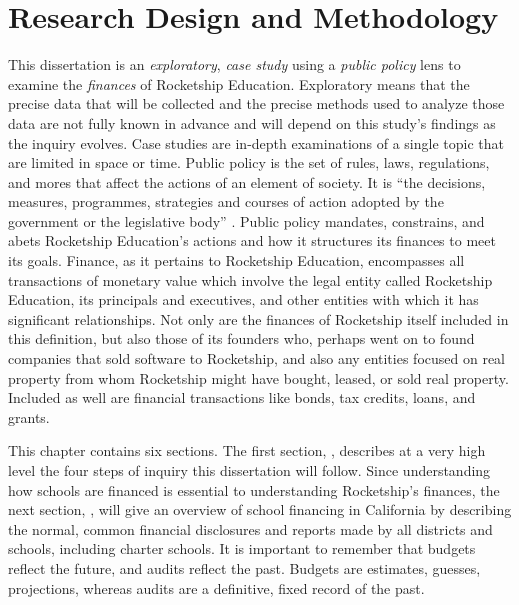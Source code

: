 
\chapter{Research Design and Methodology}\label{ch:methods}\indent

This dissertation is an \textit{exploratory}, \textit{case study} using a \textit{public policy} lens to examine the \textit{finances} of Rocketship Education. Exploratory means that the precise data that will be collected and the precise methods used to analyze those data are not fully known in advance and will depend on this study's findings as the inquiry evolves. Case studies are in-depth examinations of a single topic that are limited in space or time. Public policy is the set of rules, laws, regulations, and mores that affect the actions of an element of society. It is ``the decisions, measures, programmes, strategies and courses of action adopted by the government or the legislative body'' \parencite[3]{Knill.Tosun2020}. Public policy mandates, constrains, and abets Rocketship Education's actions and how it structures its finances to meet its goals. Finance, as it pertains to Rocketship Education, encompasses all transactions of monetary value which involve the legal entity called Rocketship Education, its principals and executives, and other entities with which it has significant relationships. Not only are the finances of Rocketship itself included in this definition, but also those of its founders who, perhaps went on to found companies that sold software to Rocketship, and also any entities focused on real property from whom Rocketship might have bought, leased, or sold real property. Included as well are financial transactions like bonds, tax credits, loans, and grants.

This chapter contains six sections. The first section, \textit{}, describes at a very high level the four steps of inquiry this dissertation will follow. Since understanding how schools are financed is essential to understanding Rocketship's finances, the next section, \textit{}, will give an overview of school financing in California by describing the normal, common financial disclosures and reports made by all districts and schools, including charter schools. It is important to remember that budgets reflect the future, and audits reflect the past. Budgets are estimates, guesses, projections, whereas audits are a definitive, fixed record of  the past. 

